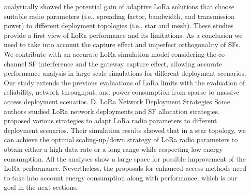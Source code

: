  \cite{ochoa_evaluating_2017}   \citet{ochoa_evaluating_2017} analytically showed the potential gain of adaptive LoRa solutions that choose suitable radio parameters (i.e., spreading factor, bandwidth, and transmission power) to different deployment topologies (i.e., star and mesh). These studies provide a first view of LoRa performance and its limitations. As a conclusion we need to take into account the capture effect and imperfect orthogonality of SFs. We contribute with an accurate LoRa simulation model considering the co-channel SF interference and the gateway capture effect, allowing accurate performance analysis in large scale simulations for different deployment scenarios. Our study extends the previous evaluations of LoRa limits with the evaluation of reliability, network throughput, and power consumption from sparse to massive access deployment scenarios. D. LoRa Network Deployment Strategies Some authors studied LoRa network deployments and SF allocation strategies.~\citet{ochoa_evaluating_2017} proposed various strategies to adapt LoRa radio parameters to different deployment scenarios. Their simulation results showed that in a star topology, we can achieve the optimal scaling-up/down strategy of LoRa radio parameters to obtain either a high data rate or a long range while respecting low energy consumption. All the analyses show a large space for possible improvement of the LoRa performance. Nevertheless, the proposals for enhanced access methods need to take into account energy consumption along with performance, which is our goal in the next sections.   \newline 
